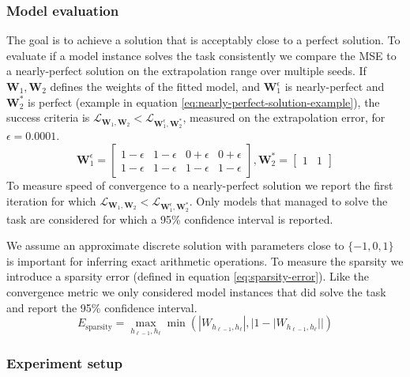 \subsubsection{Model evaluation}
The goal is to achieve a solution that is acceptably close to a perfect solution. To evaluate if a model instance solves the task consistently we compare the MSE to a nearly-perfect solution on the extrapolation range over multiple seeds. If $\mathbf{W}_1, \mathbf{W}_2$ defines the weights of the fitted model, and $\mathbf{W}_1^\epsilon$ is nearly-perfect and $\mathbf{W}_2^*$ is perfect (example in equation \ref{eq:nearly-perfect-solution-example}), the success criteria is $\mathcal{L}_{\mathbf{W}_1, \mathbf{W}_2} < \mathcal{L}_{\mathbf{W}_1^\epsilon, \mathbf{W}_2^*}$, measured on the extrapolation error, for $\epsilon = 0.0001$.
\begin{equation}
    \mathbf{W}_1^\epsilon = \begin{bmatrix}
    1 - \epsilon & 1 - \epsilon & 0 + \epsilon & 0 + \epsilon \\
    1 - \epsilon & 1 - \epsilon & 1 - \epsilon & 1 - \epsilon
    \end{bmatrix}, \mathbf{W}_2^* = \begin{bmatrix}
    1 & 1
    \end{bmatrix}
    \label{eq:nearly-perfect-solution-example}
\end{equation}
To measure speed of convergence to a nearly-perfect solution we report the first iteration for which $\mathcal{L}_{\mathbf{W}_1, \mathbf{W}_2} < \mathcal{L}_{\mathbf{W}_1^\epsilon, \mathbf{W}_2^*}$.
Only models that managed to solve the task are considered for which a 95\% confidence interval is reported.

We assume an approximate discrete solution with parameters close to $\{-1, 0, 1\}$ is important for inferring exact arithmetic operations.
To measure the sparsity we introduce a sparsity error (defined in equation \ref{eq:sparsity-error}).
Like the convergence metric we only considered model instances that did solve the task and report the 95\% confidence interval.
\begin{equation}
E_\mathrm{sparsity} = \max_{h_{\ell-1}, h_{\ell}} \min(|W_{h_{\ell-1},h_\ell}|, |1 - |W_{h_{\ell-1},h_\ell}||)
\label{eq:sparsity-error}
\end{equation}

\subsubsection{Experiment setup}

